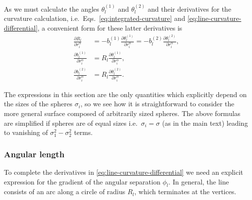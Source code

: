 As we must calculate the angles $\theta_l^{(1)}$ and $\theta_l^{(2)}$ and their derivatives for the curvature calculation, i.e.\ Eqs.\ \eqref{eq:integrated-curvature} and \eqref{eq:line-curvature-differential}, a convenient form for these latter derivatives is
\begin{subequations}
\begin{align}
  \frac{\partial R_l}{\partial r_i^\alpha} &
  = - b_l^{(1)} \frac{\partial\theta_l^{(1)}}{\partial r_i^\alpha}
  = - b_l^{(2)} \frac{\partial\theta_l^{(2)}}{\partial r_i^\alpha}, \\
  \frac{\partial b_l^{(1)}}{\partial r_i^\alpha} &=
  R_l \frac{\partial\theta_l^{(1)}}{\partial r_i^\alpha}, \\
  \frac{\partial b_l^{(2)}}{\partial r_i^\alpha} &=
  R_l \frac{\partial\theta_l^{(2)}}{\partial r_i^\alpha}.
\end{align}
\end{subequations}

The expressions in this section are the only quantities which explicitly depend on the sizes of the spheres $\sigma_i$, so we see how it is straightforward to consider the more general surface composed of arbitrarily sized spheres.
The above formulas are simplified if spheres are of equal sizes i.e.\ $\sigma_i = \sigma$ (as in the main text) leading to vanishing of $\sigma_1^2 - \sigma_2^2$ terms.

\subsubsection{Angular length}

To complete the derivatives in \eqref{eq:line-curvature-differential} we need an explicit expression for the gradient of the angular separation $\phi_l$.
In general, the line consists of an arc along a circle of radius $R_l$, which terminates at the vertices.

